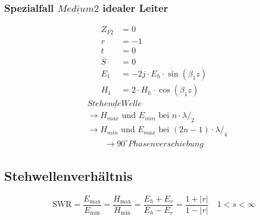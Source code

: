 \subsubsection{Spezialfall $\underline{Medium 2}$ idealer Leiter}
\begin{align*}
    Z_{F2}       & = 0                                 \\
    r            & = -1                                \\
    t            & = 0                                 \\
    \overline{S} & = 0                                 \\
    E_1          & = -2j\cdot E_h\cdot \sin(\beta_1 z) \\
    H_1          & = 2\cdot H_h\cdot \cos(\beta_1 z)
\end{align*}
\begin{align*}
     & \underline{Stehende Welle}                                              \\
     & \rightarrow \text{$H_{max}$ und $E_{min}$ bei } n \cdot \lambda/_2      \\
     & \rightarrow \text{$H_{min}$ und $E_{max}$ bei } (2n-1) \cdot \lambda/_4 \\
     & \qquad \rightarrow 90^\circ Phasenverschiebung
\end{align*}

\newpage


\subsection{Stehwellenverhältnis}
\[
    \mathrm{SWR} = \frac{E_{\max}}{E_{\min}}=\frac{H_{\max}}{H_{\min}}=\frac{E_{h}+E_{r}}{E_{h}-E_{r}} = \frac{1+|r|}{1-|r|} \quad 1<s<\infty
\]

